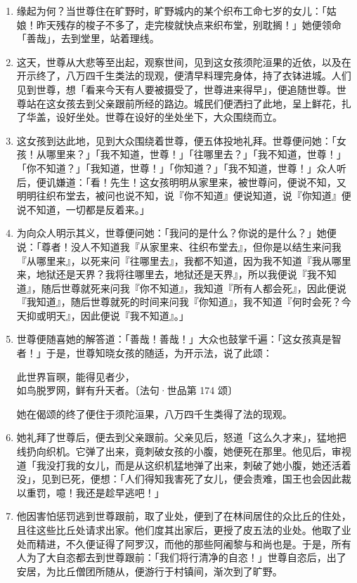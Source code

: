 \begin{enumerate}\item 缘起为何？当世尊住在旷野时，旷野城内的某个织布工命七岁的女儿：「姑娘！昨天残存的梭子不多了，走完梭就快点来织布堂，别耽搁！」她便领命「善哉」，去到堂里，站着理线。
\item 这天，世尊从大悲等至出起，观察世间，见到这女孩须陀洹果的近依，以及在开示终了，八万四千生类法的现观，便清早料理完身体，持了衣钵进城。人们见到世尊，想「看来今天有人要被摄受了，世尊进来得早」，便追随世尊。世尊站在这女孩去到父亲跟前所经的路边。城民们便洒扫了此地，呈上鲜花，扎了华盖，设好坐处。世尊在设好的坐处坐下，大众围绕而立。
\item 这女孩到达此地，见到大众围绕着世尊，便五体投地礼拜。世尊便问她：「女孩！从哪里来？」「我不知道，世尊！」「往哪里去？」「我不知道，世尊！」「你不知道？」「我知道，世尊！」「你知道？」「我不知道，世尊！」众人听后，便讥嫌道：「看！先生！这女孩明明从家里来，被世尊问，便说不知，又明明往织布堂去，被问也说不知，说『你不知道』便说知道，说『你知道』便说不知道，一切都是反着来。」
\item 为向众人明示其义，世尊便问她：「我问的是什么？你说的是什么？」她便说：「尊者！没人不知道我『从家里来、往织布堂去』，但你是以结生来问我『从哪里来』，以死来问『往哪里去』，我都不知道，因为我不知道『我从哪里来，地狱还是天界？我将往哪里去，地狱还是天界』，所以我便说『我不知道』，随后世尊就死来问我『你不知道』，我知道『所有人都会死』，因此便说『我知道』，随后世尊就死的时间来问我『你知道』，我不知道『何时会死？今天抑或明天』，因此便说『我不知道』。」
\item 世尊便随喜她的解答道：「善哉！善哉！」大众也鼓掌千遍：「这女孩真是智者！」于是，世尊知晓女孩的随适，为开示法，说了此颂：\begin{quoting}此世界盲暝，能得见者少，\\如鸟脱罗网，鲜有升天者。{\bluefootnotesize 〔法句·世品第 174 颂〕}\end{quoting}她在偈颂的终了便住于须陀洹果，八万四千生类得了法的现观。
\item 她礼拜了世尊后，便去到父亲跟前。父亲见后，怒道「这么久才来」，猛地把线扔向织机。它弹了出来，竟刺破女孩的小腹，她便死在那里。他见后，审视道「我没打我的女儿，而是从这织机猛地弹了出来，刺破了她小腹，她还活着没」，见到已死，便想：「人们得知我害死了女儿，便会责难，国王也会因此裁以重罚，噫！我还是趁早逃吧！」
\item 他因害怕惩罚逃到世尊跟前，取了业处，便到了在林间居住的众比丘的住处，且往这些比丘处请求出家。他们度其出家后，更授了皮五法的业处。他取了业处而精进，不久便证得了阿罗汉，而他的那些阿阇黎与和尚也是。于是，所有人为了大自恣都去到世尊跟前：「我们将行清净的自恣！」世尊自恣后，出了安居，为比丘僧团所随从，便游行于村镇间，渐次到了旷野。

\end{enumerate}
